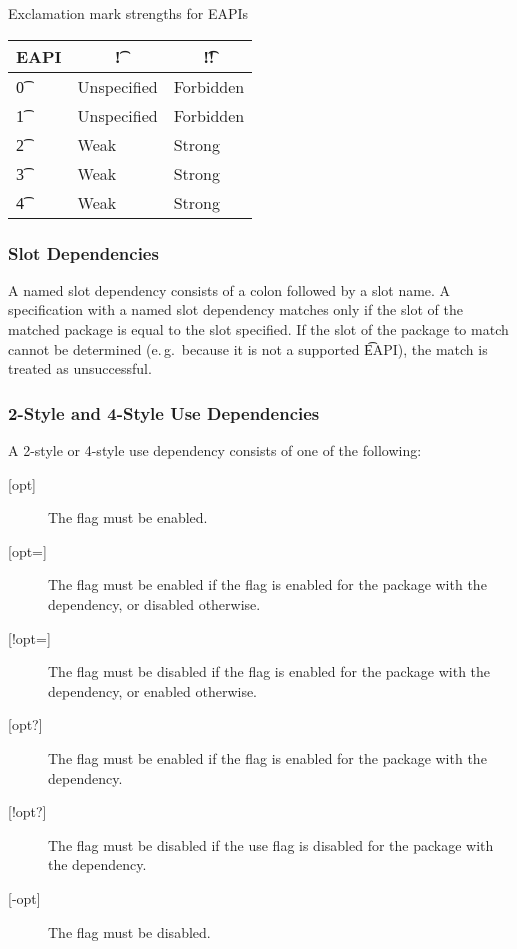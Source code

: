 \begin{centertable}{Exclamation mark strengths for EAPIs} \label{tab:bang-strength-table}
    \begin{tabular}{ l l l }
        \toprule
            \multicolumn{1}{c}{\textbf{EAPI}} &
            \multicolumn{1}{c}{\textbf{\t{!}}} &
            \multicolumn{1}{c}{\textbf{\t{!!}}} \\
            \midrule
    \t{0} & Unspecified & Forbidden \\
    \t{1} & Unspecified & Forbidden \\
    \t{2} & Weak & Strong \\
    \t{3} & Weak & Strong \\
    \t{4} & Weak & Strong \\
    \bottomrule
    \end{tabular}
\end{centertable}

\subsubsection{Slot Dependencies}
\label{sec:slot-dep}

 A named slot dependency consists of a colon followed by a slot name. A
specification with a named slot dependency matches only if the slot of the matched package is equal
to the slot specified. If the slot of the package to match cannot be determined (e.\,g.\ because it
is not a supported \t{EAPI}), the match is treated as unsuccessful.

\subsubsection{2-Style and 4-Style Use Dependencies}
\label{sec:use-dep}

A 2-style or 4-style use dependency consists of one of the following:

\begin{description}
\item[{[opt]}] The flag must be enabled.
\item[{[opt=]}] The flag must be enabled if the flag is enabled for the package with the
    dependency, or disabled otherwise.
\item[{[!opt=]}] The flag must be disabled if the flag is enabled for the package with the
    dependency, or enabled otherwise.
\item[{[opt?]}] The flag must be enabled if the flag is enabled for the package with the
    dependency.
\item[{[!opt?]}] The flag must be disabled if the use flag is disabled for the package with the
    dependency.
\item[{[-opt]}] The flag must be disabled.
\end{description}

